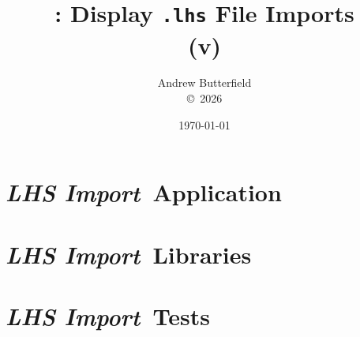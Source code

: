 \documentclass[fleqn,10pt]{report}
\author{
Andrew Butterfield
\\
{\small \copyright\ 2026}
}
\title{
  \lhsimport: Display \texttt{.lhs} File Imports
  \\(v\litStackVersion)
}
\date{
\today
}
\def\lhsimport{\textit{\textsf{LHS Import}}}
\begin{document}
\maketitle
\tableofcontents

\chapter{\lhsimport\ Application}



\chapter{\lhsimport\ Libraries}

\newpage
\newpage
\newpage


\chapter{\lhsimport\ Tests}

% 



\end{document}
